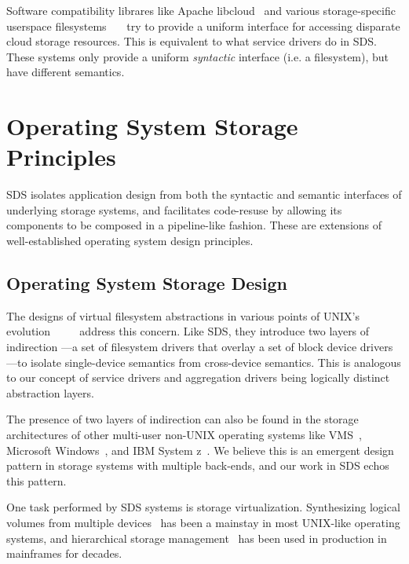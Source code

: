 Software compatibility librares like Apache libcloud~\cite{libcloud} and various
storage-specific userspace
filesystems~\cite{s3fs}~\cite{dropbox-client}~\cite{google-drive-fs} try to
provide a uniform interface for accessing disparate cloud storage resources.
This is equivalent to what service drivers do in SDS.  These systems only provide a uniform
\emph{syntactic} interface (i.e. a filesystem), but have different semantics.

\section{Operating System Storage Principles}

SDS isolates application design from both the syntactic and semantic interfaces
of underlying storage systems, and facilitates code-resuse by allowing
its components to be composed in a pipeline-like fashion.  These are extensions of
well-established operating system design principles.

\subsection{Operating System Storage Design}

The designs of virtual filesystem abstractions in various points of UNIX's evolution
~\cite{vnodes-sun-1986}~\cite{netbsd4.4-vfs-1995}~\cite{plan9-filesystem}~\cite{freebsd-design-book}
address this concern.  Like SDS, they introduce two layers of indirection
---a set of filesystem drivers that overlay a set of block device drivers---to
isolate single-device semantics from cross-device semantics.  This is analogous
to our concept of service drivers and aggregation drivers being logically
distinct abstraction layers.

The presence of two layers of indirection can also be found in the storage
architectures of other multi-user non-UNIX
operating systems like VMS~\cite{vms-driver-model}, Microsoft
Windows~\cite{ms-windows-driver-model}, and IBM System z~\cite{ibm-vsams}.
We believe this is an emergent design pattern in storage systems with multiple
back-ends, and our work in SDS echos this pattern.

One task performed by SDS systems is storage virtualization.  Synthesizing
logical volumes from multiple devices~\cite{lvm} has been a mainstay in most UNIX-like
operating systems, and hierarchical storage management~\cite{hsm} has been used
in production in mainframes for decades.

